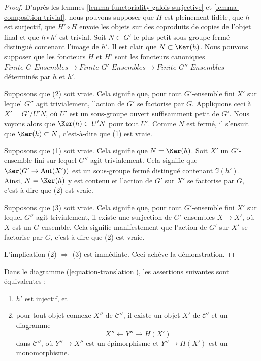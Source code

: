 \begin{proof}
D'après les lemmes \ref{lemma-functoriality-galois-surjective} et
\ref{lemma-composition-trivial}, nous pouvons supposer que
$H$ est pleinement fidèle, que $h$ est surjectif, que $H' \circ H$ envoie les
objets sur des coproduits de copies de l'objet final et que $h \circ h'$
est trivial. Soit $N \subset G'$ le plus petit sous-groupe fermé distingué
contenant l'image de $h'$. Il est clair que
$N \subset \Ker(h)$.
Nous pouvons supposer que les foncteurs $H$ et $H'$ sont les foncteurs canoniques
$\textit{Finite-}G\textit{-Ensembles} \to \textit{Finite-}G'\textit{-Ensembles}
\to \textit{Finite-}G''\textit{-Ensembles}$ déterminés par $h$ et $h'$.

\medskip\noindent
Supposons que (2) soit vraie. Cela signifie que, pour tout $G'$-ensemble fini $X'$
sur lequel $G''$ agit trivialement, l'action de $G'$ se factorise par $G$.
Appliquons ceci à $X' = G'/U'N$, où $U'$ est un sous-groupe ouvert suffisamment petit de $G'$.
Nous voyons alors que $\Ker(h) \subset U'N$ pour tout $U'$. Comme $N$ est fermé,
il s'ensuit que $\Ker(h) \subset N$, c'est-à-dire que (1) est vraie.

\medskip\noindent
Supposons que (1) soit vraie. Cela signifie que $N = \Ker(h)$. Soit $X'$ un
$G'$-ensemble fini sur lequel $G''$ agit trivialement. Cela signifie que
$\Ker(G' \to \text{Aut}(X'))$ est un sous-groupe fermé distingué contenant
$\Im(h')$. Ainsi, $N = \Ker(h)$ y est contenu et l'action de $G'$
sur $X'$ se factorise par $G$, c'est-à-dire que (2) est vraie.

\medskip\noindent
Supposons que (3) soit vraie. Cela signifie que, pour tout $G'$-ensemble fini $X'$
sur lequel $G''$ agit trivialement, il existe une surjection de $G'$-ensembles
$X \to X'$, où $X$ est un $G$-ensemble. Cela signifie manifestement que l'action de
$G'$ sur $X'$ se factorise par $G$, c'est-à-dire que (2) est vraie.

\medskip\noindent
L'implication (2) $\Rightarrow$ (3) est immédiate. Ceci achève la démonstration.
\end{proof}

\begin{lemma}
\label{lemma-functoriality-galois-injective}
Dans le diagramme (\ref{equation-translation}), les assertions suivantes sont équivalentes :
\begin{enumerate}
\item $h'$ est injectif, et
\item pour tout objet connexe $X''$ de $\mathcal{C}''$,
il existe un objet $X'$ de $\mathcal{C}'$ et un diagramme
$$
X'' \leftarrow Y'' \rightarrow H(X')
$$
dans $\mathcal{C}''$, où $Y'' \to X''$ est un épimorphisme et
$Y'' \to H(X')$ est un monomorphisme.
\end{enumerate}
\end{lemma}

